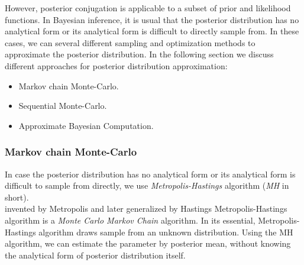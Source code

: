 However, posterior conjugation is applicable to a subset of prior and likelihood functions. In
Bayesian inference, it is usual that the posterior distribution has no analytical form or its
analytical form is difficult to directly sample from. In these cases, we can several different
sampling and optimization methods to approximate the posterior distribution. In the following
section we discuss different approaches for posterior distribution approximation:
\begin{itemize}
    \item Markov chain Monte-Carlo.
    \item Sequential Monte-Carlo.
    \item Approximate Bayesian Computation.
\end{itemize}

\subsubsection{Markov chain Monte-Carlo}
In case the posterior distribution has no analytical form or its analytical form is difficult to
sample from directly, we use \textit{Metropolis-Hastings} algorithm  (\textit{MH} in short).\\
invented by Metropolis \cite{metropolis1953equation} and later generalized by Hastings \cite{hastings1970monte}
Metropolis-Hastings algorithm is a \textit{Monte Carlo Markov Chain} algorithm. In its essential,
Metropolis-Hastings algorithm draws sample from an unknown distribution. Using the MH algorithm, we
can estimate the parameter by posterior mean, without knowing the analytical form of posterior
distribution itself.

